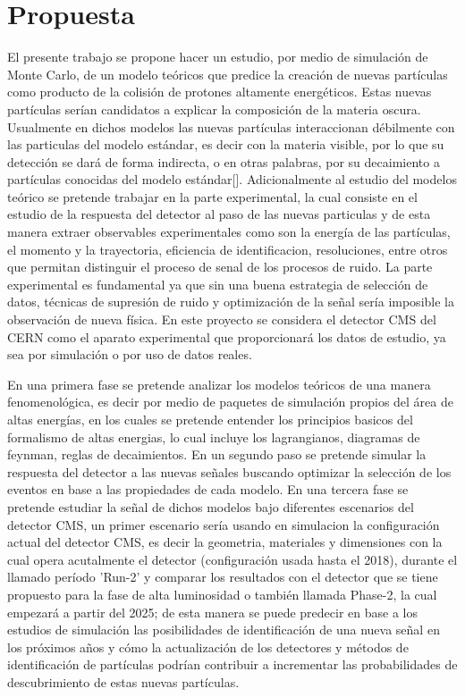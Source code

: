 \chapter{Propuesta}

El presente trabajo se propone hacer un estudio, por medio de simulación de Monte Carlo, de un modelo teóricos que predice la creación de nuevas partículas como producto de la colisión de protones altamente energéticos. Estas nuevas partículas serían candidatos a explicar la composición de la materia oscura. Usualmente en dichos modelos las nuevas partículas interaccionan débilmente con las particulas del modelo estándar, es decir con la materia visible, por lo que su detección se dará de forma indirecta, o en otras palabras, por su decaimiento a partículas conocidas del modelo estándar[\cite{Curtin2015}]. Adicionalmente al estudio del modelos teórico se pretende trabajar en la parte experimental, la cual consiste en el estudio de la respuesta del detector al paso de las nuevas particulas y de esta manera extraer observables experimentales como son la energía de las partículas, el momento y la trayectoria, eficiencia de identificacion, resoluciones, entre otros que permitan distinguir el proceso de senal de los procesos de ruido. La parte experimental es fundamental ya que sin una buena estrategia de selección de datos, técnicas de supresión de ruido y optimización de la señal sería imposible la observación de nueva física. En este proyecto se considera el detector CMS del CERN como el aparato experimental que proporcionará los datos de estudio, ya sea por simulación o por uso de datos reales.

En una primera fase se pretende analizar los modelos teóricos de una manera fenomenológica, es decir por medio de paquetes de simulación propios del área de altas energías, en los cuales se pretende entender los principios basicos del formalismo de altas energias, lo cual incluye los lagrangianos, diagramas de feynman, reglas de decaimientos. En un segundo paso se pretende simular la respuesta del detector a las nuevas señales buscando optimizar la selección de los eventos en base a las propiedades de cada modelo. En una tercera fase se pretende estudiar la señal de dichos modelos bajo diferentes escenarios del detector CMS, un primer escenario sería usando en simulacion la configuración actual del detector CMS, es decir la geometria, materiales y dimensiones con la cual opera acutalmente el detector (configuración usada hasta el 2018), durante el llamado período 'Run-2' y comparar los resultados con el detector que se tiene propuesto para la fase de alta luminosidad o también llamada Phase-2, la cual empezará a partir del 2025; de esta manera se puede predecir en base a los estudios de simulación las posibilidades de identificación de una nueva señal en los próximos años y cómo la actualización de los detectores y métodos de identificación de partículas podrían contribuir a incrementar las probabilidades de descubrimiento de estas nuevas partículas.



